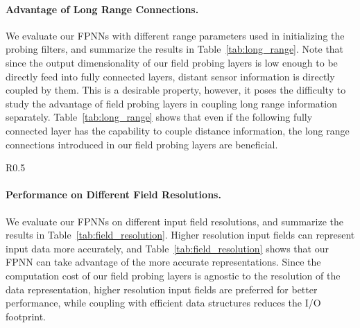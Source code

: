 \documentclass{article}
\begin{document}
\paragraph{Advantage of Long Range Connections.}
We evaluate our FPNNs with different range parameters  used in initializing the probing filters, and summarize the results in Table~\ref{tab:long_range}. Note that since the output dimensionality of our field probing layers is low enough to be directly feed into fully connected layers, distant sensor information is directly coupled by them. This is a desirable property, however, it poses the difficulty to study the advantage of field probing layers in coupling long range information separately. Table~\ref{tab:long_range} shows that even if the following fully connected layer has the capability to couple distance information, the long range connections introduced in our field probing layers are beneficial.

\begin{wraptable}{R}{0.5\linewidth}
\vspace{-0.8cm}
	\begin{center}
	\end{center}
	\vspace{-0.3cm}
	\caption{Performance on different field resolutions.}
	\label{tab:field_resolution}
	\vspace{-0.3cm}
\end{wraptable}
\paragraph{Performance on Different Field Resolutions.}
We evaluate our FPNNs on different input field resolutions, and summarize the results in Table~\ref{tab:field_resolution}. Higher resolution input fields can represent input data more accurately, and Table~\ref{tab:field_resolution} shows that our FPNN can take advantage of the more accurate representations. Since the computation cost of our field probing layers is agnostic to the resolution of the data representation, higher resolution input fields are preferred for better performance, while coupling with efficient data structures reduces the I/O footprint.
\end{document}
